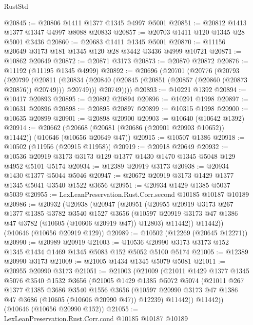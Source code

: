 \begin{lexlean}{RustStd}
\begin{coremodule}
@20845 := @20806 @1411 @1377 @1345 @4997 @5001
@20851 := @20812 @1413 @1377 @1347 @4997 @8088 @20833
@20857 := @20703 @1411 @120 @1345 @28 @5001 @3436
@20860 := @20683 @1411 @1345 @5001
@20870 := @11156 @20649 @3173 @181 @1345 @120 @28 @3442 @3436 @4999 @10721
@20871 := @10862 @20649
@20872 := @20871 @3173
@20873 := @20870 @20872
@20876 := @11192 (@11195 @1345 @4999)
@20892 := @20696
    (@20701
      (@20776
        (@20793
          (@20799
            (@20811
              (@20834 (@20840 (@20845 (@20851 (@20857 (@20860 (@20873 @20876)) @20749))) @20749)))
            @20749))))
@20893 := @10221 @1392
@20894 := @10417 @20893
@20895 := @20892 @20894
@20896 := @10291 @1998
@20897 := @10631 @20896
@20898 := @20895 @20897
@20899 := @10315 @1998
@20900 := @10635 @20899
@20901 := @20898 @20900
@20903 := @10640 (@10642 @1392)
@20914 := @20662
    (@20668 (@20681 (@20686 (@20901 @20903 @10652)) @11442))
    (@10646 (@10656 @20649 @47))
@20915 := @10507 @1386
@20918 := @10502 (@11956 (@20915 @11958))
@20919 := @20918 @20649
@20932 := @10536 @20919 @3173 @3173 @129 @1377 @1430 @1470 @1345 @5048 @129 @4952 @5101 @5174
@20934 := @12389 @20919 @3173
@20938 := @20934 @1430 @1377 @5044 @5046
@20947 := @20672 @20919 @3173 @1429 @1377 @1345 @5041 @3540 @1522 @3656
@20951 := @20934 @1429 @1385 @5037 @5039
@20955 := LexLeanPreservation.Rust.Corr.second @10185 @10187 @10189
@20986 := @20932
    (@20938
      (@20947
        (@20951
          (@20955
            @20919
            @3173
            @267
            @1377
            @1385
            @3782
            @3540
            @1527
            @3656
            (@10597 @20919 @3173 @47 @1386 @47 @3782 (@10605 (@10606 @20919 @47)) @12803)
            @11442))
        @11442))
    (@10646 (@10656 @20919 @129))
@20989 := @10502 (@12269 (@20645 @12271))
@20990 := @20989 @20919
@21003 := @10536 @20990 @3173 @3173 @152 @1345 @1434 @1469 @1345 @5083 @152 @5052 @5100 @5174
@21005 := @12389 @20990 @3173
@21009 := @21005 @1434 @1345 @5079 @5081
@21011 := @20955 @20990 @3173
@21051 := @21003
    (@21009
      (@21011
        @1429
        @1377
        @1345
        @5076
        @3540
        @1532
        @3656
        (@21005
          @1429
          @1385
          @5072
          @5074
          (@21011
            @267
            @1377
            @1385
            @3686
            @3540
            @1556
            @3656
            (@10597 @20990 @3173 @47 @1386 @47 @3686 (@10605 (@10606 @20990 @47)) @12239)
            @11442))
        @11442))
    (@10646 (@10656 @20990 @152))
@21055 := LexLeanPreservation.Rust.Corr.cond @10185 @10187 @10189

\end{coremodule}
\end{lexlean}
